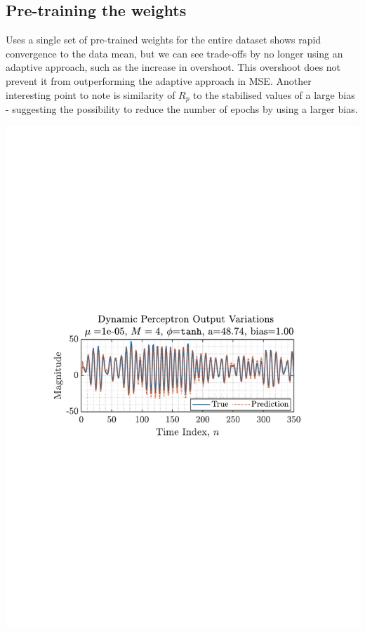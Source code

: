 \documentclass[12pt]{article}
\begin{document}
	\subsection{Pre-training the weights} \label{sec: 4-5-weight-training-dynamic-perceptron}
		\begin{minipage}[b]{0.49\textwidth}
			Uses a single set of pre-trained weights for the entire dataset shows rapid convergence to the data mean, but we can see trade-offs by no longer using an adaptive approach, such as the increase in overshoot. This overshoot does not prevent it from outperforming the adaptive approach in MSE. Another interesting point to note is similarity of $R_p$ to the stabilised values of a large bias - suggesting the possibility to reduce the number of epochs by using a larger bias.
		\end{minipage}%
		\begin{minipage}{0.04\textwidth}
			\hspace*{0.04\textwidth}
		\end{minipage}%
		\begin{minipage}[b]{0.49\textwidth}
			\centering
			\includegraphics[trim={2.2cm 11.2cm 3.15cm  11.2cm}, clip, width=\textwidth]{../MATLAB/figures/q4_5_fig01.pdf} 
			\captionsetup{justification=centering}
			\label{fig: 4-5}
		\end{minipage}%
\end{document}
